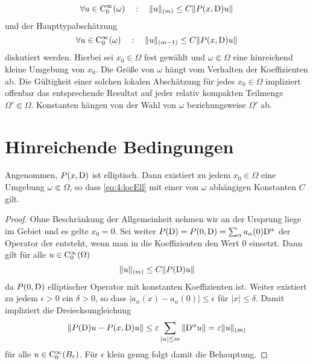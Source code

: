 \begin{equation}\label{eq:4:locEll}
\forall u\in\mathrm C_0^\infty(\omega)\quad:\quad    \| u\|_{(m)} \le C \| P(x,\mathrm D) u \|
\end{equation}
und der Haupttypabschätzung 
\begin{equation}\label{eq:4:locHT}
\forall u\in\mathrm C_0^\infty(\omega)\quad:\quad   \| u\|_{(m-1)} \le C \| P(x,\mathrm D) u \|
\end{equation}
diskutiert werden. Hierbei sei $x_0\in\Omega$ fest gewählt und $\omega\Subset\Omega$ eine hinreichend kleine Umgebung von $x_0$. Die Größe von $\omega$ hängt vom Verhalten der Koeffizienten ab. Die Gültigkeit einer solchen lokalen Abschätzung für jedes $x_0\in\Omega$ impliziert offenbar das entsprechende Resultat auf jeder relativ kompakten Teilmenge $\Omega'\Subset\Omega$. Konstanten hängen von der Wahl von $\omega$ beziehungsweise $\Omega'$ ab.



\section{Hinreichende Bedingungen}


\begin{thm}
Angenommen, $P(x,\mathrm D)$ ist elliptisch. Dann existiert zu jedem $x_0\in\Omega$ eine Umgebung $\omega\Subset\Omega$, so dass
\eqref{eq:4:locEll} mit einer von $\omega$ abhängigen Konstanten $C$ gilt. 
\end{thm}
\begin{proof}
Ohne Beschränkung der Allgemeinheit nehmen wir an der Ursprung liege im Gebiet und es gelte $x_0=0$. Sei weiter $P(\mathrm D)=P(0,\mathrm D)=\sum_\alpha a_\alpha(0)\mathrm D^\alpha$ der Operator der entsteht, wenn man in die Koeffizienten den Wert $0$ einsetzt. Dann gilt für alle $u\in\mathrm C_0^\infty(\Omega)$
\begin{equation}
 \|u\|_{(m)} \le C  \| P(\mathrm D) u\| 
\end{equation}
da $P(0,\mathrm D)$ elliptischer Operator mit konstanten Koeffizienten ist. Weiter existiert zu jedem $\epsilon>0$ ein $\delta>0$, so dass
$|a_\alpha(x)-a_\alpha(0)|\le \epsilon$ für $|x|\le\delta$. Damit impliziert die Dreiecksungleichung
\begin{equation}
  \| P(\mathrm D) u - P(x,\mathrm D) u\| \le \varepsilon \sum_{|\alpha|\le m} \|\mathrm D^\alpha u\| = \varepsilon \|u\|_{(m)}
\end{equation}
für alle $u\in\mathrm C_0^\infty(B_\varepsilon)$. Für $\epsilon$ klein genug folgt damit die Behauptung.
\end{proof}

